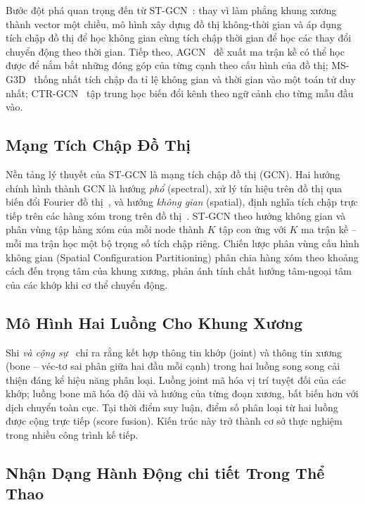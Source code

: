 \documentclass[conference]{IEEEtran}
\begin{document}
Bước đột phá quan trọng đến từ ST-GCN~\cite{yan2018stgcn}: thay vì làm
phẳng khung xương thành vector một chiều, mô hình xây dựng đồ thị
không-thời gian và áp dụng tích chập đồ thị để học không gian cùng tích
chập thời gian để học các thay đổi chuyển động theo thời gian. Tiếp theo, AGCN~\cite{shi2019agcn} đề xuất
ma trận kề có thể học được để nắm bắt những đóng góp của từng cạnh theo cấu hình của đồ thị; MS-G3D~\cite{liu2020msg3d} thống nhất
tích chập đa tỉ lệ không gian và thời gian vào một toán tử duy nhất;
CTR-GCN~\cite{chen2021ctr} tập trung học biến đổi kênh theo ngữ cảnh
cho từng mẫu đầu vào.

\subsection{Mạng Tích Chập Đồ Thị}

Nền tảng lý thuyết của ST-GCN là mạng tích chập đồ thị (GCN). Hai
hướng chính hình thành GCN là hướng \textit{phổ} (spectral), xử lý tín
hiệu trên đồ thị qua biến đổi Fourier đồ thị~\cite{bruna2014spectral,
kipf2017gcn}, và hướng \textit{không gian} (spatial), định nghĩa tích
chập trực tiếp trên các hàng xóm trong trên đồ
thị~\cite{niepert2016learning}. ST-GCN theo hướng không gian và phân
vùng tập hàng xóm của mỗi node thành $K$ tập con ứng với $K$ ma trận
kề -- mỗi ma trận học một bộ trọng số tích chập riêng. Chiến lược phân
vùng cấu hình không gian (Spatial Configuration Partitioning) phân chia
hàng xóm theo khoảng cách đến trọng tâm của khung xương, phản ánh
tính chất hướng tâm-ngoại tâm của các khớp khi cơ thể chuyển động.

\subsection{Mô Hình Hai Luồng Cho Khung Xương}

Shi \textit{và cộng sự}~\cite{shi2019agcn} chỉ ra rằng kết hợp thông tin
khớp (joint) và thông tin xương (bone -- véc-tơ sai phân giữa hai đầu
mỗi cạnh) trong hai luồng song song cải thiện đáng kể hiệu năng phân
loại. Luồng joint mã hóa vị trí tuyệt đối của các khớp; luồng bone mã
hóa độ dài và hướng của từng đoạn xương, bất biến hơn với dịch chuyển
toàn cục. Tại thời điểm suy luận, điểm số phân loại từ hai luồng được
cộng trực tiếp (score fusion). Kiến trúc này trở thành cơ sở thực nghiệm 
trong nhiều công trình kế tiếp.

\subsection{Nhận Dạng Hành Động chi tiết Trong Thể Thao}
\end{document}
